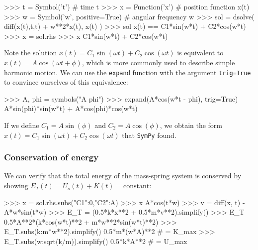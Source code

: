 \small
\begin{verbatimtab}
>>> t = Symbol('t')                   # time            t
>>> x = Function('x')                 # position function x(t)
>>> w = Symbol('w', positive=True)    # angular frequency w
>>> sol = dsolve( diff(x(t),t,t) + w**2*x(t), x(t) )
>>> sol
x(t) == C1*sin(w*t) + C2*cos(w*t)  
>>> x = sol.rhs           
>>> x 
C1*sin(w*t) + C2*cos(w*t)
\end{verbatimtab}
\normalsize

\noindent
Note the solution $x(t)=C_1\sin(\omega t)+C_2 \cos(\omega t)$ is equivalent to $x(t) = A\cos(\omega t + \phi)$, 
which is more commonly used to describe simple harmonic motion. 
We can use the \texttt{expand} function with the argument \texttt{trig=True} to convince ourselves of this equivalence:

\small
\begin{verbatimtab}
>>> A, phi = symbols("A phi")
>>> expand(A*cos(w*t - phi), trig=True)
A*sin(phi)*sin(w*t) + A*cos(phi)*cos(w*t)
\end{verbatimtab}
\normalsize

\noindent
If we define $C_1=A\sin(\phi)$ and $C_2=A\cos(\phi)$, 
we obtain the form $x(t)=C_1\sin(\omega t)+C_2 \cos(\omega t)$ that \texttt{SymPy} found.


\subsubsection{Conservation of energy}

We can verify that the total energy of the mass-spring system is conserved by showing $E_T(t) = U_s(t) + K(t) = \textrm{constant}$: 

\small
\begin{verbatimtab}
>>> x = sol.rhs.subs({"C1":0,"C2":A}) 
>>> x
A*cos(t*w)
>>> v = diff(x, t)
-A*w*sin(t*w)
>>> E_T = (0.5*k*x**2 + 0.5*m*v**2).simplify()
>>> E_T
0.5*A**2*(k*cos(w*t)**2 + m*w**2*sin(w*t)**2)
>>> E_T.subs({k:m*w**2}).simplify()
0.5*m*(w*A)**2                            # = K_max
>>> E_T.subs({w:sqrt(k/m)}).simplify()
0.5*k*A**2                                # = U_max 
\end{verbatimtab}
\normalsize




